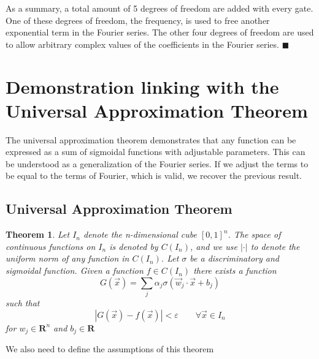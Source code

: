 \documentclass[aps,amssymb,amsmath,amsfonts,pra,superscriptaddress,onecolumn]{revtex4}
\newcommand{\ket}[1]{| #1 \rangle}
\newtheorem{theorem}{Theorem}
\begin{document}
As a summary, a total amount of 5 degrees of freedom are added with every gate. One of these degrees of freedom, the frequency, is used to free another exponential term in the Fourier series. The other four degrees of freedom are used to allow arbitrary complex values of the coefficients in the Fourier series.  $\blacksquare$


\section{Demonstration linking with the Universal Approximation Theorem}
The universal approximation theorem demonstrates that any function can be expressed as a sum of sigmoidal functions with adjustable parameters. This can be understood as a generalization of the Fourier series. If we adjust the terms to be equal to the terms of Fourier, which is valid, we recover the previous result.
\subsection{Universal Approximation Theorem}
\begin{theorem}\label{th:UAT}
Let $I_n$ denote the n-dimensional cube $[0, 1]^n$. The space of continuous functions on $I_n$ is denoted by $C(I_n)$, and we use $|\cdot|$ to denote the uniform norm of any function in $C(I_n)$. 
Let $\sigma$ be a discriminatory and sigmoidal function. 
Given a function $f \in C(I_n)$ there exists a function 
\begin{equation}\label{eq:UAT}
    G(\vec x) = \sum_j \alpha_j \sigma(\vec w_j \cdot \vec x + b_j)
\end{equation}
such that 
\begin{equation}
    |G(\vec x) - f(\vec x)| < \varepsilon \qquad \forall \vec x \in I_n
\end{equation}
for $w_j\in \mathbf{R}^n$ and $b_j \in \mathbf{R}$
\end{theorem}
We also need to define the assumptions of this theorem
\end{document}
